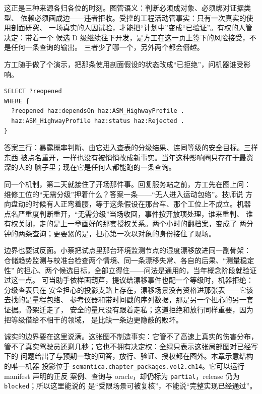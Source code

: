 这正是三种来源各归各位的时刻。图管语义：判断必须成对象、必须绑对证据类型、
依赖必须画成边——违者拒收。受控的工程活动管事实：只有一次真实的使用剖面研究、
一场真实的人因试验，才能把“计划中”变成“已验证”。有权的人管决定：带着一个
候选 D 级继续往下开发，是方工在这一页上签下的风险接受，不是任何一条查询的输出。
三者少了哪一个，另外两个都会僭越。

方工随手做了个演示，把那条使用剖面假设的状态改成“已拒绝”，问机器谁受影响。

\nopagebreak[4]
\begin{codebox}
\begin{Verbatim}[fontsize=\small,breaklines=true,breakanywhere=true,breaksymbolleft={},breaksymbolright={}]
SELECT ?reopened
WHERE {
  ?reopened haz:dependsOn haz:ASM_HighwayProfile .
  haz:ASM_HighwayProfile haz:status haz:Rejected .
}
\end{Verbatim}
\end{codebox}

答案三行：暴露概率判断、由它进入查表的分级结果、连同等级的安全目标。三样东西
被点名重开，一样也没有被悄悄改成新事实。当年这种影响圈只存在于最资深的人的
脑子里；现在它是任何人都能跑的一条查询。

同一个机制，第二天就接住了开场那件事。回复服务站之前，方工先在图上问：
维修工位的“无需分级”押着什么？答案一条——“无人进入运动包络”。技师说
方向盘动的时候有人正弯着腰，等于这条假设在那台车、那个工位上不成立。机器
点名严重度判断重开，“无需分级”当场收回，事件按开放项处理，谁来重判、
谁有权关闭，走的是上一章画好的那套授权关系。两个小时的翻档案，变成了
两分钟的两条查询；更要紧的是，担心第一次以对象的身份接住了现场。

边界也要试反面。小蔡把试点里那台环境监测节点的湿度漂移放进同一副骨架：
仓储趋势监测与校准台检查两个情境、同一条漂移失常、各自的后果、“测量稳定性”
的担心、两个候选目标，全部立得住——问法是通用的，当年概念阶段就验证过这一点。
可当助手依样画葫芦，提议给漂移事件也配一个等级时，机器拒绝：分级查表只在
安全担心的投影支路上存在，漂移场景没有资格进那张表——它该去找的是量程包络、
参考仪器和带时间戳的序列数据，那是另一个担心的另一套证据。骨架迁走了，
安全的量尺没有跟着走私；这道拒绝和放行同样重要，因为把等级借给不相干的领域，
是比缺一条边更隐蔽的败坏。

诚实的边界要在这里说满。这张图不制造事实：它管不了高速上真实的伤害分布，
管不了真实驾驶员还剩几秒；它也不拥有决定权：全绿只表示这张局部图对已经写下的
问题给出了与预期一致的回答，放行、验证、授权都在图外。本章示意结构的唯一机器
投影位于 \nolinkurl{semantica.chapter_packages.vol2.ch14}。它可以运行 manifest 声明的正反
案例、查询与 oracle，却仍标为 \nolinkurl{partial}，release 仍为 \nolinkurl{blocked}；所以这里能说的
是“受限场景可被复核”，不能说“完整实现已经通过”。

